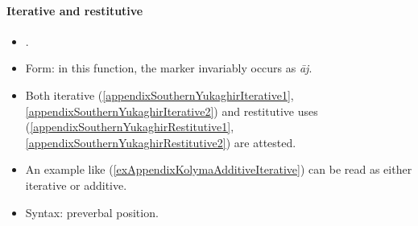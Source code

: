 \paragraph{Iterative and restitutive}
\label{appendixSouthernYukaghirIterative}
\begin{itemize}
	\item \textcite[528–529]{Maslova2003}.
	\item Form: in this function, the marker invariably occurs as \textit{āj}.
	\item Both iterative (\ref{appendixSouthernYukaghirIterative1}, \ref{appendixSouthernYukaghirIterative2}) and restitutive uses (\ref{appendixSouthernYukaghirRestitutive1}, \ref{appendixSouthernYukaghirRestitutive2}) are attested.
	\item An example like (\ref{exAppendixKolymaAdditiveIterative}) can be read as either iterative or additive.
	\item Syntax: preverbal position.
\end{itemize}

